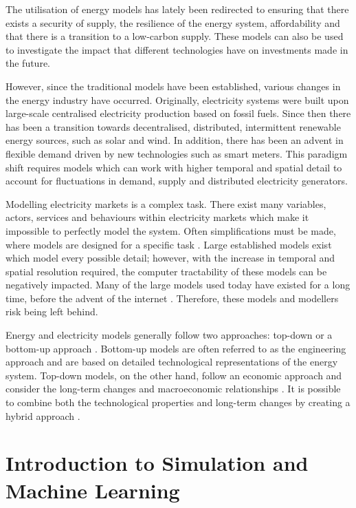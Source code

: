 The utilisation of energy models has lately been redirected to ensuring that there exists a security of supply, the resilience of the energy system, affordability and that there is a transition to a low-carbon supply. These models can also be used to investigate the impact that different technologies have on investments made in the future. 

However, since the traditional models have been established, various changes in the energy industry have occurred. Originally, electricity systems were built upon large-scale centralised electricity production based on fossil fuels. Since then there has been a transition towards decentralised, distributed, intermittent renewable energy sources, such as solar and wind. In addition, there has been an advent in flexible demand driven by new technologies such as smart meters. This paradigm shift requires models which can work with higher temporal and spatial detail to account for fluctuations in demand, supply and distributed electricity generators.

Modelling electricity markets is a complex task. There exist many variables, actors, services and behaviours within electricity markets which make it impossible to perfectly model the system. Often simplifications must be made, where models are designed for a specific task \cite{Pfenninger2014b}. Large established models exist which model every possible detail; however, with the increase in temporal and spatial resolution required, the computer tractability of these models can be negatively impacted. Many of the large models used today have existed for a long time, before the advent of the internet \cite{Pfenninger2014b}. Therefore, these models and modellers risk being left behind.

Energy and electricity models generally follow two approaches: top-down or a bottom-up approach \cite{Ringkjob2018}. Bottom-up models are often referred to as the engineering approach and are based on detailed technological representations of the energy system. Top-down models, on the other hand, follow an economic approach and consider the long-term changes and macroeconomic relationships \cite{Mai2013}. It is possible to combine both the technological properties and long-term changes by creating a hybrid approach \cite{Fortes2014}.




\section{Introduction to Simulation and Machine Learning}
\label{sec:intro:simulationmodelling}


